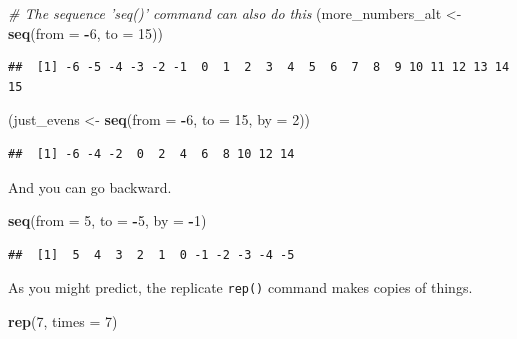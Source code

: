 \documentclass[]{article}
\newenvironment{Shaded}{\begin{snugshade}}{\end{snugshade}}
\newcommand{\KeywordTok}[1]{\textcolor[rgb]{0.13,0.29,0.53}{\textbf{#1}}}
\newcommand{\DataTypeTok}[1]{\textcolor[rgb]{0.13,0.29,0.53}{#1}}
\newcommand{\DecValTok}[1]{\textcolor[rgb]{0.00,0.00,0.81}{#1}}
\newcommand{\StringTok}[1]{\textcolor[rgb]{0.31,0.60,0.02}{#1}}
\newcommand{\CommentTok}[1]{\textcolor[rgb]{0.56,0.35,0.01}{\textit{#1}}}
\newcommand{\OperatorTok}[1]{\textcolor[rgb]{0.81,0.36,0.00}{\textbf{#1}}}
\newcommand{\NormalTok}[1]{#1}
\begin{document}
\begin{Shaded}
\begin{Highlighting}[]
\CommentTok{# The sequence 'seq()' command can also do this}
\NormalTok{(more_numbers_alt <-}\StringTok{ }\KeywordTok{seq}\NormalTok{(}\DataTypeTok{from =} \OperatorTok{-}\DecValTok{6}\NormalTok{, }\DataTypeTok{to =} \DecValTok{15}\NormalTok{))}
\end{Highlighting}
\end{Shaded}

\begin{verbatim}
##  [1] -6 -5 -4 -3 -2 -1  0  1  2  3  4  5  6  7  8  9 10 11 12 13 14 15
\end{verbatim}

\begin{Shaded}
\begin{Highlighting}[]
\NormalTok{(just_evens <-}\StringTok{ }\KeywordTok{seq}\NormalTok{(}\DataTypeTok{from =} \OperatorTok{-}\DecValTok{6}\NormalTok{, }\DataTypeTok{to =} \DecValTok{15}\NormalTok{, }\DataTypeTok{by =} \DecValTok{2}\NormalTok{))}
\end{Highlighting}
\end{Shaded}

\begin{verbatim}
##  [1] -6 -4 -2  0  2  4  6  8 10 12 14
\end{verbatim}

And you can go backward.

\begin{Shaded}
\begin{Highlighting}[]
\KeywordTok{seq}\NormalTok{(}\DataTypeTok{from =} \DecValTok{5}\NormalTok{, }\DataTypeTok{to =} \OperatorTok{-}\DecValTok{5}\NormalTok{, }\DataTypeTok{by =} \OperatorTok{-}\DecValTok{1}\NormalTok{)}
\end{Highlighting}
\end{Shaded}

\begin{verbatim}
##  [1]  5  4  3  2  1  0 -1 -2 -3 -4 -5
\end{verbatim}

As you might predict, the replicate \texttt{rep()} command makes copies
of things.

\begin{Shaded}
\begin{Highlighting}[]
\KeywordTok{rep}\NormalTok{(}\DecValTok{7}\NormalTok{, }\DataTypeTok{times =} \DecValTok{7}\NormalTok{)}
\end{Highlighting}
\end{Shaded}
\end{document}
